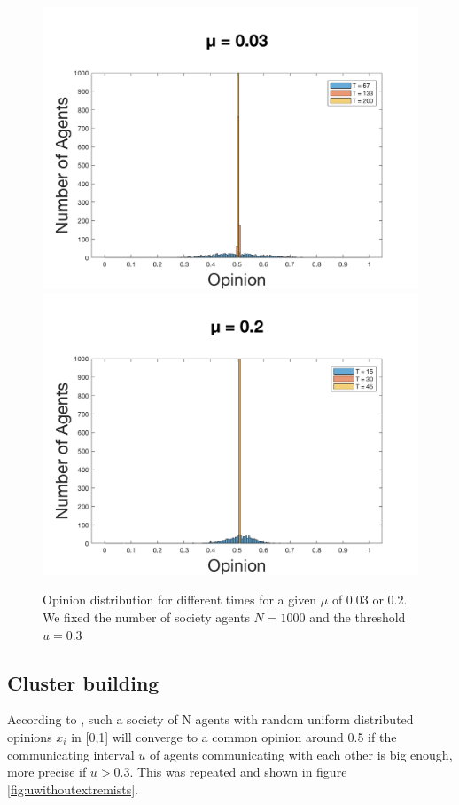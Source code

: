 \documentclass[11pt]{article}
\begin{document}
\begin{figure}[!htb]
  \includegraphics[width=\linewidth]{gen_plot_2017121418225017531e+01.png}
\endminipage\hfill
{}
  \includegraphics[width=\linewidth]{gen_plot_2017121418224358724e+01.png}
\endminipage
\caption{Opinion distribution for different times for a given $\mu$ of 0.03 or 0.2. We fixed the number of society agents $N = 1000$ and the threshold $u = 0.3$}
\label{fig:muwithoutextremists}
\end{figure}


\subsection{Cluster building}
According to \cite{Minor}, such a society of N agents with random uniform distributed opinions $x_i$ in [0,1] will converge to a common opinion around 0.5 if the communicating interval $u$ of agents communicating with each other is big enough, more precise if $u>0.3$. This was repeated and shown in figure \ref{fig:uwithoutextremists}. \\
\end{document}

